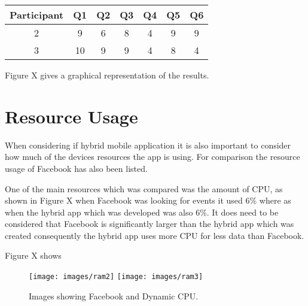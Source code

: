 \begin{center} 
 \begin{tabular}{||c c c c c c c||}  
 \hline
  \hline
 Participant & Q1 & Q2 & Q3 & Q4 & Q5 & Q6 \\
 \hline
 2 & 9 & 6 & 8 & 4 & 9 & 9 \\
 \hline
 3 & 10 & 9 & 9 & 4 & 8 & 4 \\
 \hline
 \hline
 \end{tabular}
 \end{center}

 Figure X gives a graphical representation of the results. 

 \section{Resource Usage}
 When considering if hybrid mobile application it is also important to consider how much of the devices resources the app is using. For comparison the resource usage of Facebook has also been listed.

 One of the main resources which was compared was the amount of CPU, as shown in Figure X when Facebook was looking for events it used 6\% where as when the hybrid app which was developed was also 6\%. It does need to be considered that Facebook is significantly larger than the hybrid app which was created consequently the hybrid app uses more CPU for less data than Facebook.

 Figure X shows 

\begin{figure}[H]
\texttt{[image: images/ram2]}
\texttt{[image: images/ram3]}
\caption{Images showing Facebook and Dynamic CPU.}
\end{figure}
